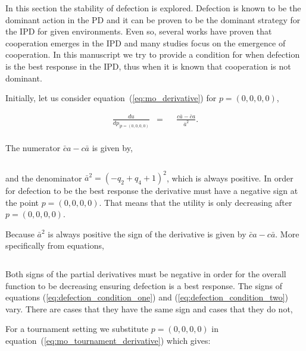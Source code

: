 \documentclass[10pt]{article}
\begin{document}
In this section the stability of defection is explored. Defection is
known to be the dominant action in the PD and it can be proven to be the dominant
strategy for the IPD for given environments. Even so, several works have proven
that cooperation emerges in the IPD and many studies focus on the
emergence of cooperation. In this manuscript we try to provide a condition for when
defection is the best response in the IPD, thus when it is known that
cooperation is not dominant.

Initially, let us consider equation~(\ref{eq:mo_derivative}) for \(p = (0, 0, 0,
0)\),

\begin{equation}\label{eq:derivative_of_quadratic_zero}
    \begin{aligned}
     \frac{du}{dp_{| p=(0, 0, 0, 0)}} & = && \frac{c \bar{a} - \bar{c}a}
      {\bar{a}^2} .\\
    \end{aligned}
\end{equation}

The numerator \(\bar{c}a - c\bar{a}\) is given by,

\[\]

and the denominator \(\bar{a} ^ 2 = (-q_2 + q_4 + 1) ^ 2\), which is always positive. In order
for defection to be the best response the derivative must have a negative
sign at the point \(p = (0, 0, 0, 0)\). That means that the utility is only
decreasing after \(p = (0, 0, 0, 0)\).

Because \(\bar{a} ^ 2\) is always positive the sign of the derivative is given by \(\bar{c}a - c\bar{a}\).
More specifically from equations,

\begin{equation}\label{eq:defection_condition_one}
    
\end{equation}
\begin{equation}\label{eq:defection_condition_two}
    
\end{equation}

Both signs of the partial derivatives must be negative in order for the overall
function to be decreasing ensuring defection is a best response.
The signs of equations (\ref{eq:defection_condition_one}) and (\ref{eq:defection_condition_two})
vary. There are cases that they have the same sign and cases that they do not,

For a tournament setting we substitute \(p = (0, 0, 0, 0)\) in
equation~(\ref{eq:mo_tournament_derivative}) which gives:
\end{document}
